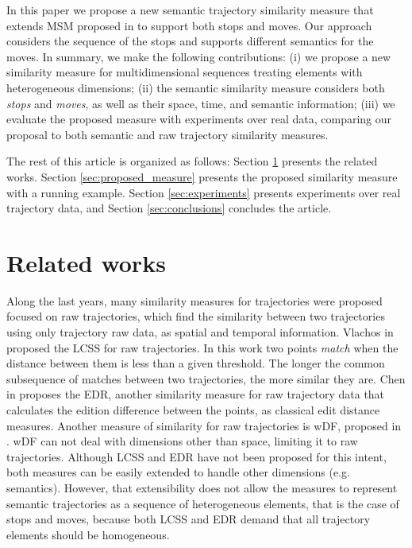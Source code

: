 \documentclass[12pt]{article}
\begin{document}
In this paper we propose a new semantic trajectory similarity measure that extends MSM proposed in \cite{Furtado:TGIS12156} to support both stops and moves. Our approach considers the sequence of the stops and supports different semantics for the moves. 
In summary, we make the following contributions:
(i) we propose a new similarity measure for multidimensional sequences treating elements with heterogeneous dimensions; (ii) the semantic similarity measure considers both \textit{stops} and \textit{moves}, as well as their space, time, and semantic information; (iii) we evaluate the proposed measure with experiments over real data, comparing our proposal to both semantic and raw trajectory similarity measures.

The rest of this article is organized as follows: Section \ref{sec:related} presents the related works. Section \ref{sec:proposed_measure} presents the proposed similarity measure with a running example. Section \ref{sec:experiments} presents experiments over real trajectory data, and Section \ref{sec:conclusions} concludes the article.

\section{Related works} \label{sec:related}
Along the last years, many similarity measures for trajectories were proposed focused on raw trajectories, which find the similarity between two trajectories using only trajectory raw data, as spatial and temporal information. Vlachos in \cite{vlachos2002discovering} proposed the LCSS for raw trajectories. In this work two points \textit{match} when the distance between them is less than a given threshold. The longer the common subsequence of matches between two trajectories, the more similar they are. Chen in \cite{Chen:2005:RFS:1066157.1066213} proposes the EDR, another similarity measure for raw trajectory data that calculates the edition difference between the points, as classical edit distance measures. Another measure of similarity for raw trajectories is wDF, proposed in \cite{Ding:2008:ESJ:1440463.1440989}. wDF can not deal with dimensions other than space, limiting it to raw trajectories. Although LCSS and EDR have not been proposed for this intent, both measures can be easily extended to handle other dimensions (e.g. semantics). However, that extensibility does not allow the measures to represent semantic trajectories as a sequence of heterogeneous elements, that is the case of stops and moves, because both LCSS and EDR demand that all trajectory elements should be homogeneous.
\end{document}
